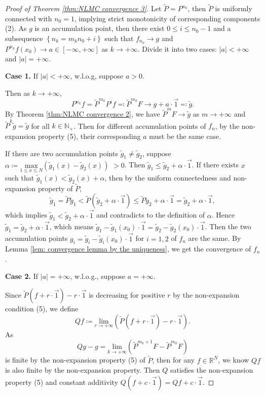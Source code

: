 \documentclass[10pt,a4paper]{amsart}
\begin{document}
\begin{proof}[Proof of Theorem \ref{thm:NLMC convergence 3}]
Let $\tilde{P}=P^{n_{0}}$, then $\tilde{P}$ is uniformly connected
with $n_{0}=1$, implying strict monotonicity of corresponding components (2). As $g$ is an accumulation
point, then there exist $0\leq i\leq n_{0}-1$ and a subsequence $\left\{ n_{k}=m_{k}n_{0}+i\right\} $
such that $f_{n_{k}}\to g$ and $P^{n_{k}}f(x_{0})\to a\in[-\infty,+\infty]$
as $k\to+\infty$. Divide it into two cases: $\mid a\mid<+\infty$
and $\mid a\mid=+\infty$.

\textbf{Case 1.} If $\mid a\mid<+\infty$, w.l.o.g, suppose $a>0$.

Then as $k\to+\infty$, $$P^{n_{k}}f=\tilde{P}^{m_{k}}P^{i}f\eqqcolon\tilde{P}^{m_{k}}F\to g+a\cdot \overrightarrow{1}\eqqcolon\tilde{g}.$$
By Theorem \ref{thm:NLMC convergence 2}, we have
$\tilde{P}^{m}F\to\tilde{g}$ as $m\to+\infty$ and $\tilde{P}^{k}\tilde{g}=\tilde{g}$
for all $k\in\mathbb{N}_{+}$. Then for different accumulation points of $f_{n}$,
by the non-expansion property (5), their corresponding $a$ must be
the same case.

If there are two accumulation points $\tilde{g}_{1}\neq\tilde{g}_{2}$,
suppose $\alpha\coloneqq\underset{1\leq x\leq N}{\text{max}}\left(\tilde{g}_{1}(x)-\tilde{g}_{2}(x)\right)$ $>0$.
Then $\tilde{g}_{1}\leq\tilde{g}_{2}+\alpha \cdot \overrightarrow{1}$. If there exists $x$
such that $\tilde{g}_{1}(x)<\tilde{g}_{2}(x)+\alpha$, then by the
uniform connectedness and non-expansion property of $\tilde{P}$, 
\[
\tilde{g}_{1}=\tilde{P}\tilde{g}_{1}<\tilde{P}\left(\tilde{g}_{2}+\alpha \cdot \overrightarrow{1} \right)\leq\tilde{P}\tilde{g}_{2}+\alpha \cdot \overrightarrow{1}=\tilde{g}_{2}+\alpha \cdot \overrightarrow{1},
\]
which implies $\tilde{g}_{1}<\tilde{g}_{2}+\alpha \cdot \overrightarrow{1}$ and contradicts
to the definition of $\alpha$. Hence $\tilde{g}_{1}=\tilde{g}_{2}+\alpha \cdot \overrightarrow{1}$,
which means $\tilde{g}_{1}-\tilde{g}_{1}(x_{0}) \cdot \overrightarrow{1}=\tilde{g}_{2}-\tilde{g}_{2}(x_{0}) \cdot \overrightarrow{1}$.
Then the two accumulation points $g_{i}=\tilde{g}_{i}-\tilde{g}_{i}(x_{0}) \cdot \overrightarrow{1}$
for $i=1,2$ of $f_{n}$ are the same. By Lemma \ref{lem: convergence lemma by the uniqueness},
we get the convergence of $f_{n}$.

\textbf{Case 2.} If $|a|=+\infty$, w.l.o.g., suppose $a=+\infty$.

Since $\tilde{P}(f+r\cdot \overrightarrow{1})-r \cdot \overrightarrow{1}$ is decreasing for positive $r$ by the non-expansion
condition (5), we define 
\[
Qf\coloneqq\underset{r\to+\infty}{\text{lim}}\left(\tilde{P}(f+r\cdot \overrightarrow{1})-r \cdot \overrightarrow{1}\right).
\]
As $$Qg-g=\underset{k\to+\infty}{\text{lim}}\left(\tilde{P}^{m_{k}+1}F-\tilde{P}^{m_{k}}F\right)$$
is finite by the non-expansion property (5) of $\tilde{P}$, then for
any $f\in\mathbb{R}^{N}$, we know $Qf$ is also finite by the non-expansion property.
Then $Q$ satisfies the non-expansion property (5) and constant additivity
$Q(f+c \cdot \overrightarrow{1})=Qf+c \cdot \overrightarrow{1} $.


\end{proof}
\end{document}
